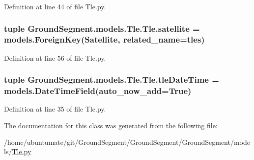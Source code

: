Definition at line 44 of file Tle.\+py.

\hypertarget{class_ground_segment_1_1models_1_1_tle_1_1_tle_a95bfe88e371279e78d31945379bd3785}{}
\subsubsection[{satellite}]{\setlength{\rightskip}{0pt plus 5cm}tuple Ground\+Segment.\+models.\+Tle.\+Tle.\+satellite = models.\+Foreign\+Key({\bf Satellite}, related\+\_\+name=\textquotesingle{}tles\textquotesingle{})\hspace{0.3cm}{\ttfamily [static]}}\label{class_ground_segment_1_1models_1_1_tle_1_1_tle_a95bfe88e371279e78d31945379bd3785}


Definition at line 56 of file Tle.\+py.

\hypertarget{class_ground_segment_1_1models_1_1_tle_1_1_tle_a66ec63c8a5d9f0a43b9aa48993e531a6}{}
\subsubsection[{tle\+Date\+Time}]{\setlength{\rightskip}{0pt plus 5cm}tuple Ground\+Segment.\+models.\+Tle.\+Tle.\+tle\+Date\+Time = models.\+Date\+Time\+Field(auto\+\_\+now\+\_\+add=True)\hspace{0.3cm}{\ttfamily [static]}}\label{class_ground_segment_1_1models_1_1_tle_1_1_tle_a66ec63c8a5d9f0a43b9aa48993e531a6}


Definition at line 35 of file Tle.\+py.



The documentation for this class was generated from the following file\+:\begin{DoxyCompactItemize}
\item 
/home/ubuntumate/git/\+Ground\+Segment/\+Ground\+Segment/\+Ground\+Segment/models/\hyperlink{_tle_8py}{Tle.\+py}\end{DoxyCompactItemize}
